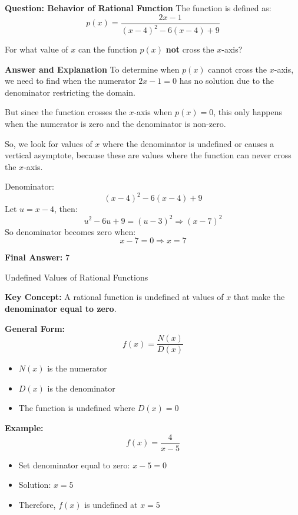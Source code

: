 \documentclass{beamer}
\begin{document}
\begin{frame}{\textbf{Question: Behavior of Rational Function}}
The function is defined as:
\[
p(x) = \frac{2x - 1}{(x - 4)^2 - 6(x - 4) + 9}
\]

For what value of \( x \) can the function \( p(x) \) \textbf{not} cross the \( x \)-axis?
\end{frame}


\begin{frame}{\textbf{Answer and Explanation}}
To determine when \( p(x) \) cannot cross the \( x \)-axis, we need to find when the numerator \( 2x - 1 = 0 \) has no solution due to the denominator restricting the domain.

But since the function crosses the \( x \)-axis when \( p(x) = 0 \), this only happens when the numerator is zero and the denominator is non-zero.

So, we look for values of \( x \) where the denominator is undefined or causes a vertical asymptote, because these are values where the function can never cross the \( x \)-axis.

Denominator:
\[
(x - 4)^2 - 6(x - 4) + 9
\]
Let \( u = x - 4 \), then:
\[
u^2 - 6u + 9 = (u - 3)^2
\Rightarrow (x - 7)^2
\]
So denominator becomes zero when:
\[
x - 7 = 0 \Rightarrow x = 7
\]

\textbf{Final Answer:} \( \boxed{7} \)
\end{frame}






\begin{frame}{Undefined Values of Rational Functions}
\small

\textbf{Key Concept:}  
A rational function is undefined at values of $x$ that make the \textbf{denominator equal to zero}.

\vspace{0.3cm}
\textbf{General Form:}
\[
f(x) = \frac{N(x)}{D(x)}
\]
\begin{itemize}
    \item $N(x)$ is the numerator
    \item $D(x)$ is the denominator
    \item The function is undefined where $D(x) = 0$
\end{itemize}

\vspace{0.2cm}
\textbf{Example:}
\[
f(x) = \frac{4}{x - 5}
\]
\begin{itemize}
    \item Set denominator equal to zero: $x - 5 = 0$
    \item Solution: $x = 5$
    \item Therefore, $f(x)$ is undefined at $x = 5$
\end{itemize}

\end{frame}
\end{document}
